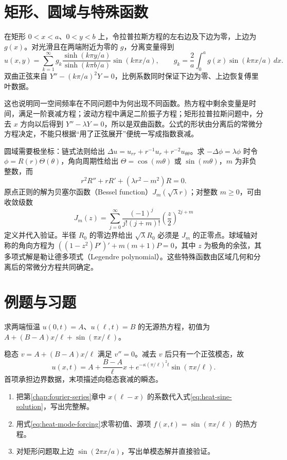 \documentclass[UTF8,12pt,a4paper,fontset=fandol]{ctexbook}
\begin{document}
\section{矩形、圆域与特殊函数}
在矩形 $0<x<a$、$0<y<b$ 上，令拉普拉斯方程的左右边及下边为零，上边为 $g(x)$。对光滑且在两端附近为零的 $g$，分离变量得到
\begin{equation}
 u(x,y)=\sum_{k=1}^\infty g_k
 \frac{\sinh(k\pi y/a)}{\sinh(k\pi b/a)}\sin(k\pi x/a),
 \qquad g_k=\frac2a\int_0^a g(x)\sin(k\pi x/a)\,dx.
 \label{eq:rectangle-laplace}
\end{equation}
双曲正弦来自 $Y''-(k\pi/a)^2Y=0$，比例系数同时保证下边为零、上边恢复傅里叶数据。

这也说明同一空间频率在不同问题中为何出现不同函数。热方程中剩余变量是时间，满足一阶衰减方程；波动方程中满足二阶振子方程；矩形拉普拉斯问题中，分去 $x$ 方向以后得到 $Y''-\lambda Y=0$，所以是双曲函数。公式的形状由分离后的常微分方程决定，不能只根据“用了正弦展开”便统一写成指数衰减。

圆域需要极坐标：链式法则给出 $\Delta u=u_{rr}+r^{-1}u_r+r^{-2}u_{\theta\theta}$。求 $-\Delta\phi=\lambda\phi$ 时令 $\phi=R(r)\Theta(\theta)$，角向周期性给出 $\Theta=\cos(m\theta)$ 或 $\sin(m\theta)$，$m$ 为非负整数，而
\[
 r^2R''+rR'+(\lambda r^2-m^2)R=0.
\]
原点正则的解为贝塞尔函数（Bessel function）$J_m(\sqrt\lambda r)$；对整数 $m\ge0$，可由收敛级数
\[
 J_m(z)=\sum_{j=0}^\infty\frac{(-1)^j}{j!(j+m)!}\left(\frac z2\right)^{2j+m}
\]
定义并代入验证。半径 $R_0$ 的零边界给出 $\sqrt\lambda R_0$ 必须是 $J_m$ 的正零点。球域轴对称的角向方程为 $((1-z^2)P')'+m(m+1)P=0$，其中 $z$ 为极角的余弦，其多项式解是勒让德多项式（Legendre polynomial）。这些特殊函数由区域几何和分离后的常微分方程共同确定。

\section{例题与习题}
\begin{example}
求两端恒温 $u(0,t)=A$、$u(\ell,t)=B$ 的无源热方程，初值为 $A+(B-A)x/\ell+\sin(\pi x/\ell)$。
\end{example}
\begin{solve}
稳态 $v=A+(B-A)x/\ell$ 满足 $v''=0$。减去 $v$ 后只有一个正弦模态，故
\[
 u(x,t)=A+\frac{B-A}{\ell}x+e^{-\kappa(\pi/\ell)^2t}\sin(\pi x/\ell).
\]
首项承担边界数据，末项描述向稳态衰减的瞬态。
\end{solve}
\begin{enumerate}
 \item 把第\ref{chap:fourier-series}章中 $x(\ell-x)$ 的系数代入式\eqref{eq:heat-sine-solution}，写出完整解。
 \item 用式\eqref{eq:heat-mode-forcing}求零初值、源项 $f(x,t)=\sin(\pi x/\ell)$ 的热方程。
 \item 对矩形问题取上边 $\sin(2\pi x/a)$，写出单模态解并直接验证。
\end{enumerate}
\end{document}
